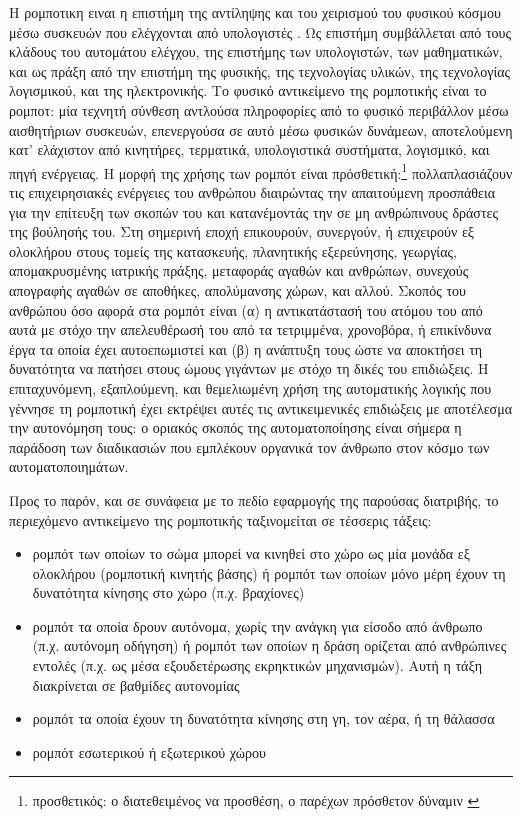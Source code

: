 Η ρομποτικη ειναι η επιστήμη της αντίληψης και του χειρισμού του φυσικού κόσμου
μέσω συσκευών που ελέγχονται από υπολογιστές \cite{thrun2005probabilistic}.  Ως
επιστήμη συμβάλλεται από τους κλάδους του αυτομάτου ελέγχου, της επιστήμης των
υπολογιστών, των μαθηματικών, και ως πράξη από την επιστήμη της φυσικής, της
τεχνολογίας υλικών, της τεχνολογίας λογισμικού, και της ηλεκτρονικής. Το φυσικό
αντικείμενο της ρομποτικής είναι το ρομποτ: μία τεχνητή σύνθεση αντλούσα
πληροφορίες από το φυσικό περιβάλλον μέσω αισθητήριων συσκευών, επενεργούσα σε
αυτό μέσω φυσικών δυνάμεων, αποτελούμενη κατ' ελάχιστον από κινητήρες,
τερματικά, υπολογιστικά συστήματα, λογισμικό, και πηγή ενέργειας. Η μορφή της
χρήσης των ρομπότ είναι πρόσθετική:\footnote{προσθετικός: ο διατεθειμένος να
προσθέση, ο παρέχων πρόσθετον δύναμιν \cite{liddell_scott}} πολλαπλασιάζουν τις
επιχειρησιακές ενέργειες του ανθρώπου διαιρώντας την απαιτούμενη προσπάθεια για
την επίτευξη των σκοπών του και κατανέμοντάς την σε μη ανθρώπινους δράστες της
βούλησής του.  Στη σημερινή εποχή επικουρούν, συνεργούν, ή επιχειρούν εξ
ολοκλήρου στους τομείς της κατασκευής, πλανητικής εξερεύνησης, γεωργίας,
απομακρυσμένης ιατρικής πράξης, μεταφοράς αγαθών και ανθρώπων, συνεχούς
απογραφής αγαθών σε αποθήκες, απολύμανσης χώρων, και αλλού.  Σκοπός του
ανθρώπου όσο αφορά στα ρομπότ είναι (α) η αντικατάστασή του ατόμου του από αυτά
με στόχο την απελευθέρωσή του από τα τετριμμένα, χρονοβόρα, ή επικίνδυνα έργα
τα οποία έχει αυτοεπωμιστεί και (β) η ανάπτυξη τους ώστε να αποκτήσει τη
δυνατότητα να πατήσει στους ώμους γιγάντων με στόχο τη δικές του επιδιώξεις. Η
επιταχυνόμενη, εξαπλούμενη, και θεμελιωμένη χρήση της αυτοματικής λογικής που
γέννησε τη ρομποτική έχει εκτρέψει αυτές τις αντικειμενικές επιδιώξεις με
αποτέλεσμα την αυτονόμηση τους: ο οριακός σκοπός της αυτοματοποίησης είναι
σήμερα η παράδοση των διαδικασιών που εμπλέκουν οργανικά τον άνθρωπο στον κόσμο
των αυτοματοποιημάτων.

Προς το παρόν, και σε συνάφεια με το πεδίο εφαρμογής της παρούσας διατριβής,
το περιεχόμενο αντικείμενο της ρομποτικής ταξινομείται σε τέσσερις τάξεις:

\begin{itemize}
  \item ρομπότ των οποίων το σώμα μπορεί να κινηθεί στο χώρο ως μία μονάδα εξ
        ολοκλήρου (ρομποτική κινητής βάσης) ή ρομπότ των οποίων μόνο μέρη έχουν
        τη δυνατότητα κίνησης στο χώρο (π.χ. βραχίονες)
  \item ρομπότ τα οποία δρουν αυτόνομα, χωρίς την ανάγκη για είσοδο από
        άνθρωπο (π.χ. αυτόνομη οδήγηση) ή ρομπότ των οποίων η δράση ορίζεται
        από ανθρώπινες εντολές (π.χ. ως μέσα εξουδετέρωσης εκρηκτικών
        μηχανισμών). Αυτή η τάξη διακρίνεται σε βαθμίδες αυτονομίας
        \cite{Beer2014}
  \item ρομπότ τα οποία έχουν τη δυνατότητα κίνησης στη γη, τον αέρα, ή τη
        θάλασσα
  \item ρομπότ εσωτερικού ή εξωτερικού χώρου
\end{itemize}

